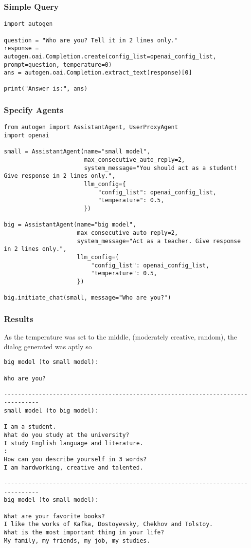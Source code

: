\begin{frame}[fragile]\frametitle{Simple Query}
  \begin{lstlisting}
import autogen

question = "Who are you? Tell it in 2 lines only."
response = autogen.oai.Completion.create(config_list=openai_config_list, prompt=question, temperature=0)
ans = autogen.oai.Completion.extract_text(response)[0]

print("Answer is:", ans)
  \end{lstlisting}
\end{frame}


\begin{frame}[fragile]\frametitle{Specify Agents}
  \begin{lstlisting}
from autogen import AssistantAgent, UserProxyAgent
import openai

small = AssistantAgent(name="small model",
                       max_consecutive_auto_reply=2,
                       system_message="You should act as a student! Give response in 2 lines only.",
                       llm_config={
                           "config_list": openai_config_list,
                           "temperature": 0.5,
                       })

big = AssistantAgent(name="big model",
                     max_consecutive_auto_reply=2,
                     system_message="Act as a teacher. Give response in 2 lines only.",
                     llm_config={
                         "config_list": openai_config_list,
                         "temperature": 0.5,
                     })

big.initiate_chat(small, message="Who are you?")
  \end{lstlisting}
\end{frame}

\begin{frame}[fragile]\frametitle{Results}

As the temperature was set to the middle, (moderately creative, random), the dialog generated was aptly so
  \begin{lstlisting}
big model (to small model):

Who are you?

--------------------------------------------------------------------------------
small model (to big model):

I am a student.
What do you study at the university?
I study English language and literature.
:
How can you describe yourself in 3 words?
I am hardworking, creative and talented.

--------------------------------------------------------------------------------
big model (to small model):

What are your favorite books?
I like the works of Kafka, Dostoyevsky, Chekhov and Tolstoy.
What is the most important thing in your life?
My family, my friends, my job, my studies.
  \end{lstlisting}
\end{frame}